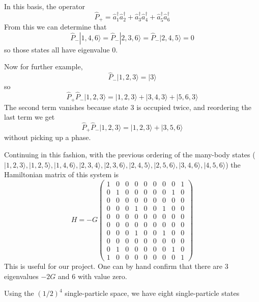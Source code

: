 \documentclass[%
twoside,                 %
final,                   %
10pt]{article}
\begin{document}
In this basis, the operator 
\[
\hat{P}_+
= \hat{a}^\dagger_1 \hat{a}^\dagger_2 + \hat{a}^\dagger_3 \hat{a}^\dagger_4 +
\hat{a}^\dagger_5 \hat{a}^\dagger_6 
\]
From this we can determine that 
\[
\hat{P}_- | 1, 4, 6 \rangle = \hat{P}_- | 2, 3, 6 \rangle
= \hat{P}_- | 2, 4, 5 \rangle = 0
\]
so those states all have eigenvalue 0.



Now for further example, 
\[
\hat{P}_- | 1,2,3 \rangle = | 3 \rangle
\]
so
\[
\hat{P}_+ \hat{P}_- | 1,2,3\rangle = | 1,2,3\rangle+ | 3,4,3\rangle + | 5,6,3\rangle
\]
The second term vanishes because state 3 is occupied twice, and reordering the last 
term we
get
\[
\hat{P}_+ \hat{P}_- | 1,2,3\rangle = | 1,2,3\rangle+ |3, 5,6\rangle
\]
without picking up a phase.



Continuing in this fashion, with the previous ordering of the many-body states
(  $| 1,2,3 \rangle, |1,2,5\rangle, | 1,4,6 \rangle, | 2,3,4 \rangle, |2,3,6 \rangle, | 2,4,5 \rangle, | 2, 5, 6 \rangle, |3,4,6 \rangle, | 4,5,6 \rangle$) the 
Hamiltonian matrix of this system is 
\[
H = -G\left( 
\begin{array}{ccccccccc}
1 & 0 & 0 & 0 & 0 & 0 & 0 & 0 & 1  \\
0 & 1 & 0 & 0 & 0 & 0 & 0 & 1 & 0  \\
0 & 0 & 0 & 0 & 0 & 0 & 0 & 0 & 0  \\
0 & 0 & 0 & 1 & 0 & 0 & 1 & 0 & 0  \\
0 & 0 & 0 & 0 & 0 & 0 & 0 & 0 & 0  \\
0 & 0 & 0 & 0 & 0 & 0 & 0 & 0 & 0  \\
0 & 0 & 0 & 1 & 0 & 0 & 1 & 0 & 0  \\
0 & 0 & 0 & 0 & 0 & 0 & 0 & 0 & 0  \\
0 & 1 & 0 & 0 & 0 & 0 & 0 & 1 & 0  \\
1 & 0 & 0 & 0 & 0 & 0 & 0 & 0 & 1  
\end{array} \right )
\] 
This is useful for our project.  One can by hand confirm 
that there are 3 eigenvalues $-2G$ and 6 with value zero.





Using the $(1/2)^4$ single-particle space, we have  eight single-particle states
\end{document}
